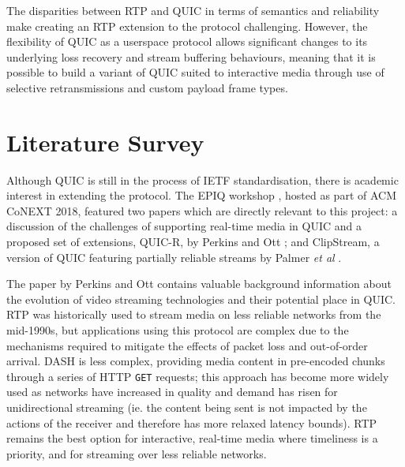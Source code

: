 \documentclass{mprop}
\begin{document}
The disparities between RTP and QUIC in terms of semantics and reliability make creating an RTP extension to the protocol challenging. However, the flexibility of QUIC as a userspace protocol allows significant changes to its underlying loss recovery and stream buffering behaviours, meaning that it is possible to build a variant of QUIC suited to interactive media through use of selective retransmissions and custom payload frame types.


\newpage

\section{Literature Survey}


Although QUIC is still in the process of IETF standardisation, there is academic interest in extending the protocol. The EPIQ workshop \cite{epiq}, hosted as part of ACM CoNEXT 2018, featured two papers which are directly relevant to this project: a discussion of the challenges of supporting real-time media in QUIC and a proposed set of extensions, QUIC-R, by Perkins and Ott \cite{Perkins2018}; and ClipStream, a version of QUIC featuring partially reliable streams by Palmer \textit{et al} \cite{Palmer2018}.

The paper by Perkins and Ott contains valuable background information about the evolution of video streaming technologies and their potential place in QUIC. RTP was historically used to stream media on less reliable networks from the mid-1990s, but applications using this protocol are complex due to the mechanisms required to mitigate the effects of packet loss and out-of-order arrival. DASH is less complex, providing media content in pre-encoded chunks through a series of HTTP \texttt{GET} requests; this approach has become more widely used as networks have increased in quality and demand has risen for unidirectional streaming (ie. the content being sent is not impacted by the actions of the receiver and therefore has more relaxed latency bounds). RTP remains the best option for interactive, real-time media where timeliness is a priority, and for streaming over less reliable networks.
\end{document}
